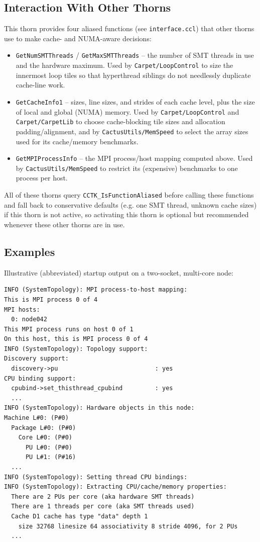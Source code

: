 \subsection{Interaction With Other Thorns}
\label{sec:interaction}

This thorn provides four aliased functions (see
\texttt{interface.ccl}) that other thorns use to make cache- and
NUMA-aware decisions:
\begin{itemize}
\item \texttt{GetNumSMTThreads} / \texttt{GetMaxSMTThreads} -- the
  number of SMT threads in use and the hardware maximum. Used by
  \texttt{Carpet/LoopControl} to size the innermost loop tiles so that
  hyperthread siblings do not needlessly duplicate cache-line work.
\item \texttt{GetCacheInfo1} -- sizes, line sizes, and strides of each
  cache level, plus the size of local and global (NUMA) memory. Used by
  \texttt{Carpet/LoopControl} and \texttt{Carpet/CarpetLib} to choose
  cache-blocking tile sizes and allocation padding/alignment, and by
  \texttt{CactusUtils/MemSpeed} to select the array sizes used for its
  cache/memory benchmarks.
\item \texttt{GetMPIProcessInfo} -- the MPI process/host mapping
  computed above. Used by \texttt{CactusUtils/MemSpeed} to restrict its
  (expensive) benchmarks to one process per host.
\end{itemize}
All of these thorns query
\texttt{CCTK\_IsFunctionAliased} before calling these functions and
fall back to conservative defaults (e.g. one SMT thread, unknown cache
sizes) if this thorn is not active, so activating this thorn is
optional but recommended whenever these other thorns are in use.

\subsection{Examples}

Illustrative (abbreviated) startup output on a two-socket, multi-core
node:
\begin{verbatim}
INFO (SystemTopology): MPI process-to-host mapping:
This is MPI process 0 of 4
MPI hosts:
  0: node042
This MPI process runs on host 0 of 1
On this host, this is MPI process 0 of 4
INFO (SystemTopology): Topology support:
Discovery support:
  discovery->pu                           : yes
CPU binding support:
  cpubind->set_thisthread_cpubind         : yes
  ...
INFO (SystemTopology): Hardware objects in this node:
Machine L#0: (P#0)
  Package L#0: (P#0)
    Core L#0: (P#0)
      PU L#0: (P#0)
      PU L#1: (P#16)
  ...
INFO (SystemTopology): Setting thread CPU bindings:
INFO (SystemTopology): Extracting CPU/cache/memory properties:
  There are 2 PUs per core (aka hardware SMT threads)
  There are 1 threads per core (aka SMT threads used)
  Cache D1 cache has type "data" depth 1
    size 32768 linesize 64 associativity 8 stride 4096, for 2 PUs
  ...
\end{verbatim}

